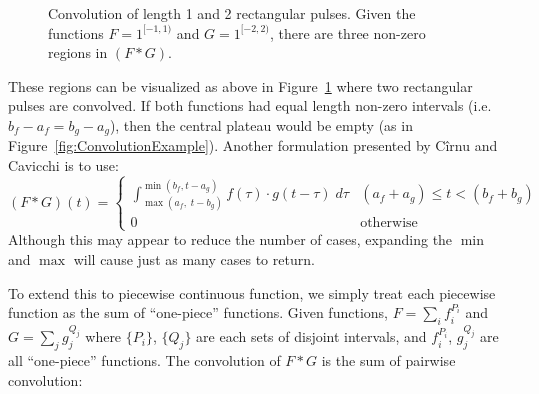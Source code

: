 \begin{figure}[ht]
	\caption[Convolution of ``one-piece'' functions]{Convolution of length 1 and 2 rectangular pulses. 
	Given the functions $F=1^{[-1,1)}$ and $G=1^{[-2,2)}$, there are three non-zero regions in $(F*G)$.
	\label{fig:OnePiece}}
	\centering
\end{figure}


These regions can be visualized as above in Figure~\ref{fig:OnePiece} where two rectangular pulses are convolved. 
If both functions had equal length non-zero intervals (i.e. $b_f-a_f = b_g-a_g$), then the central plateau would be empty
(as in Figure~\ref{fig:ConvolutionExample}).
Another formulation presented by C\^{i}rnu \cite{cirnu2012calculation} and Cavicchi \cite{cavicchi2002simplified} is to use:
\begin{equation}
	\label{eqn:ConvCirnu}
	(F*G)(t)=
	\begin{cases}
		\int_{\max(a_f, \; t-b_g)}^{\min(b_f, t-a_g)} f(\tau)\cdot g(t-\tau)\; d\tau & (a_f+a_g) \leq t < (b_f+b_g) \\
		0 & \text{otherwise}
	\end{cases}
\end{equation}
Although this may appear to reduce the number of cases, expanding the $\min$ and $\max$ will cause just as many 
cases to return.


To extend this to piecewise continuous function, 
we simply treat each piecewise function as the sum of ``one-piece'' functions.
Given functions, $F= \sum_i f_i^{P_i}$ and $G= \sum_j g_j^{Q_j}$ 
where $\{P_i\}$, $\{Q_j\}$ are each sets of disjoint intervals, and $f_i^{P_i}$, $g_j^{Q_j}$ are all ``one-piece'' functions.
The convolution of $F*G$ is the sum of pairwise convolution:

